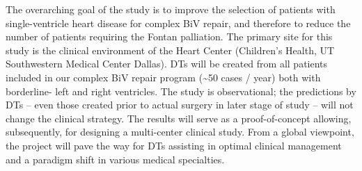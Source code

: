 The overarching goal of the study is to 
improve the selection of patients with single-ventricle heart disease %
for complex BiV repair, and therefore
to reduce the number of patients %
requiring the Fontan palliation. 
The primary site for this study is the clinical environment of the Heart Center (Children's Health, UT Southwestern Medical Center Dallas). DTs will be created from all patients included in our complex BiV repair program (\textasciitilde{}50 cases / year) both with borderline- left and right ventricles. 
The study is observational; the predictions by DTs -- even those created prior to actual surgery in later stage of study --  will not change the clinical strategy. %
The  results will serve as a proof-of-concept allowing, subsequently, for designing a multi-center clinical study. From a global viewpoint, the project will pave the way for DTs assisting in optimal clinical management %
and a paradigm shift in various medical specialties.


